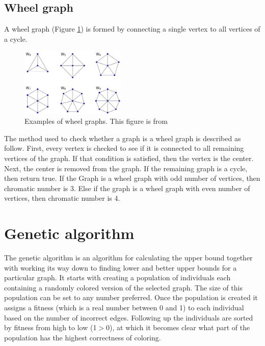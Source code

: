 \documentclass[a4paper]{report}
\begin{document}
			\subsection{Wheel graph}
			A wheel graph (Figure \ref{fig:wheel}) is formed by connecting a single vertex to all vertices of a cycle.
		
			\begin{figure}[h]
				\centering
				\includegraphics[width=50mm,scale=0.5]{figures/wheel.png}
				\caption{Examples of wheel graphs. This figure is from \protect\cite{wheelFig}}
				\label{fig:wheel}
			\end{figure}
			
			The method used to check whether a graph is a wheel graph is described as follow. First, every vertex is checked to see if it is connected to all remaining vertices of the graph. If that condition is satisfied, then the vertex is the center. Next, the center is removed from the graph. If the remaining graph is a cycle, then return true.
			If the Graph is a wheel graph with odd number of vertices, then chromatic number is 3.
			Else if the graph is a wheel graph with even number of vertices, then chromatic number is 4.
			
			
		\section{Genetic algorithm}
		The genetic algorithm is an algorithm for calculating the upper bound together with working its way down to finding lower and better upper bounds for a particular graph. It starts with creating a population of individuals each containing a randomly colored version of the selected graph. The size of this population can be set to any number preferred. Once the population is created it assigns a fitness (which is a real number between 0 and 1) to each individual based on the number of incorrect edges. Following up the individuals are sorted by fitness from high to low (1$>$0), at which it becomes clear what part of the population has the highest correctness of coloring.\\
		
\end{document}
